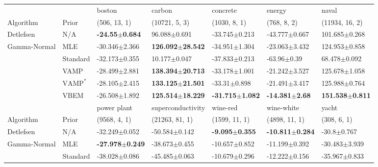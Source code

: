 \begin{tabular}{lllllll}
\toprule
             &      &                     boston &                       carbon &                    concrete &                     energy &                       naval \\
Algorithm & Prior& (506, 13, 1)& (10721, 5, 3)& (1030, 8, 1)& (768, 8, 2)& (11934, 16, 2)\\
\midrule
Detlefsen & N/A &  \textbf{-24.55$\pm$0.684} &             96.088$\pm$0.691 &           -33.745$\pm$0.213 &          -43.777$\pm$0.667 &           101.685$\pm$0.268 \\
Gamma-Normal & MLE &          -30.346$\pm$2.366 &  \textbf{126.092$\pm$28.542} &           -34.951$\pm$1.304 &          -23.063$\pm$3.432 &           124.953$\pm$0.858 \\
             & Standard &          -32.173$\pm$0.355 &             10.177$\pm$0.047 &           -37.833$\pm$0.213 &            -63.96$\pm$0.39 &            68.478$\pm$0.092 \\
             & VAMP &          -28.499$\pm$2.881 &  \textbf{138.394$\pm$20.713} &           -33.178$\pm$1.001 &          -21.242$\pm$3.527 &           125.678$\pm$1.058 \\
             & $\text{VAMP}^*$ &          -28.105$\pm$2.415 &  \textbf{133.125$\pm$21.501} &            -33.31$\pm$0.898 &          -21.491$\pm$3.417 &           125.988$\pm$0.764 \\
             & VBEM &          -26.508$\pm$1.892 &  \textbf{125.514$\pm$18.229} &  \textbf{-31.715$\pm$1.082} &  \textbf{-14.381$\pm$2.68} &  \textbf{151.538$\pm$0.811} \\
\midrule
             &      &                 power plant &           superconductivity &                   wine-red &                  wine-white &                      yacht \\
Algorithm & Prior& (9568, 4, 1)& (21263, 81, 1)& (1599, 11, 1)& (4898, 11, 1)& (308, 6, 1)\\
\midrule
Detlefsen & N/A &           -32.249$\pm$0.052 &           -50.584$\pm$0.142 &  \textbf{-9.095$\pm$0.355} &  \textbf{-10.811$\pm$0.284} &            -30.8$\pm$0.767 \\
Gamma-Normal & MLE &  \textbf{-27.978$\pm$0.249} &           -38.673$\pm$0.455 &          -10.657$\pm$0.852 &           -11.199$\pm$0.392 &          -30.483$\pm$3.939 \\
             & Standard &           -38.028$\pm$0.086 &           -45.485$\pm$0.063 &          -10.679$\pm$0.296 &           -12.222$\pm$0.156 &          -35.967$\pm$0.833 \\

\end{tabular}
